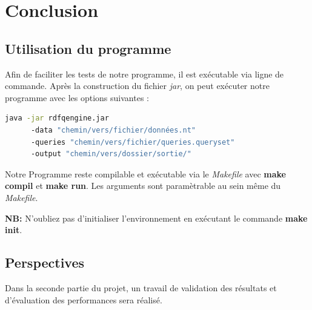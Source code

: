 \documentclass[12pt,titlepage]{article}
\begin{document}
\section{Conclusion}

\subsection{Utilisation du programme}

Afin de faciliter les tests de notre programme, il est exécutable via ligne de commande. Après la construction du fichier \textit{jar}, on peut exécuter notre programme avec les options suivantes : 

\begin{lstlisting}[language=Bash]
  java -jar rdfqengine.jar 
      -data "chemin/vers/fichier/données.nt" 
      -queries "chemin/vers/fichier/queries.queryset" 
      -output "chemin/vers/dossier/sortie/"
\end{lstlisting}

Notre Programme reste compilable et exécutable via le \textit{Makefile} avec \textbf{make compil} et \textbf{make run}. Les arguments sont paramètrable au sein même du \textit{Makefile}.

\textbf{NB:} N'oubliez pas d'initialiser l'environnement en exécutant le commande \textbf{make init}. 

\subsection{Perspectives}

Dans la seconde partie du projet, un travail de validation des résultats et d'évaluation des performances sera réalisé.
\end{document}
